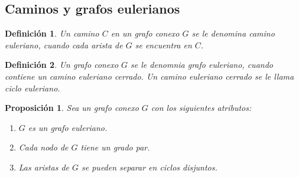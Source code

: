 \documentclass[12pt]{article}
\newtheorem{definition}{Definición}
\newtheorem{lemma}{Proposición}
\begin{document}
\subsection{Caminos y grafos eulerianos}
\begin{definition}
Un camino $C$ en un grafo conexo $G$ se le denomina \emph{camino euleriano}, cuando cada arista de $G$ se encuentra en $C$.
\end{definition}
\begin{definition}
Un grafo conexo $G$ se le denomnia \emph{grafo euleriano}, cuando contiene un camino euleriano cerrado. Un camino euleriano cerrado se le llama ciclo euleriano.
\end{definition}
\begin{lemma}
Sea un grafo conexo $G$ con los siguientes atributos:
\begin{enumerate}
\item $G$ es un grafo euleriano.
\item Cada nodo de $G$ tiene un grado par.
\item Las aristas de $G$ se pueden separar en ciclos disjuntos.
\end{enumerate}
\end{lemma}
\end{document}
